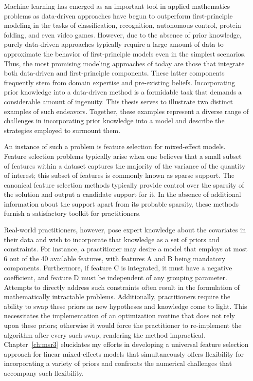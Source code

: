 Machine learning has emerged as an important tool in applied mathematics problems as data-driven approaches have begun to outperform  first-principle modeling in the tasks of classification, recognition, autonomous control, protein folding, and even video games. However, due to the absence of prior knowledge,  purely data-driven approaches typically require a large amount of data to approximate the behavior of first-principle models even in the simplest scenarios. Thus, the most promising modeling approaches of today are those that integrate both data-driven and first-principle components. These latter components frequently stem from domain expertise and pre-existing beliefs. Incorporating prior knowledge into a data-driven method is a formidable task that demands a considerable amount of ingenuity. This thesis serves to illustrate two distinct examples of such endeavors.  Together, these examples represent a diverse range of challenges in incorporating prior knowledge into a model and describe the strategies employed to surmount them.

An instance of such a problem is feature selection for mixed-effect models. Feature selection problems typically arise when one believes that a small subset of features within a dataset captures the majority of the variance of the quantity of interest; this subset of features is commonly known as sparse support. The canonical feature selection methods typically provide control over the  sparsity of the solution and output a candidate support for it. In the absence of additional information about the support apart from its probable sparsity, these methods furnish a satisfactory toolkit for practitioners.

 Real-world practitioners, however, pose expert knowledge about the covariates in their data and wish to incorporate that knowledge as a set of priors and constraints. For instance, a practitioner may desire a model that employs at most 6 out of the 40 available features, with features A and B being mandatory components. Furthermore, if feature C is integrated, it must have a negative coefficient, and feature D must be independent of any grouping parameter. Attempts to directly address such constraints often result in the formulation of mathematically intractable problems. Additionally, practitioners require the ability to swap these priors as new hypotheses and knowledge come to light. This necessitates the implementation of an optimization routine that does not rely upon these priors; otherwise it would force the practitioner to re-implement the algorithm after every such swap, rendering the method impractical. Chapter~\ref{ch:msr3} elucidates my efforts in developing a universal feature selection approach for linear mixed-effects models that simultaneously offers flexibility for incorporating a variety of priors and confronts the numerical challenges that accompany such flexibility.

